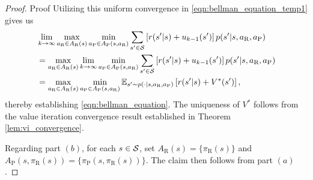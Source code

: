 \documentclass[aoas]{imsart}
\theoremstyle{plain}
\theoremstyle{definition}
\begin{document}
\begin{proof}{Proof}
           Utilizing this uniform convergence in \eqref{eqn:bellman_equation_temp1} gives us 
           \begin{align*}
           &\lim_{k \to \infty}\max_{a_\text{R} \in A_\text{R}(s)}\min_{a_\text{P} \in A_\text{P}(s,a_\text{R})}\sum_{s' \in {\cal S}}\left[r(s'|s) + u_{k-1}(s')\right]p(s'|s,a_\text{R},a_\text{P})\\
           &= \max_{a_\text{R} \in A_\text{R}(s)}\lim_{k \to \infty}\min_{a_\text{P} \in A_\text{P}(s,a_\text{R})}\sum_{s' \in {\cal S}}\left[r(s'|s) + u_{k-1}(s')\right]p(s'|s,a_\text{R},a_\text{P})\\
           &= \max_{a_\text{R} \in A_\text{R}(s)}\min_{a_\text{P} \in A_\text{P}(s,a_\text{R})}\mathbb{E}_{s' \sim p(\cdot|s,a_\text{R},a_\text{P})}\left[r(s'|s) + V^*(s')\right],
           \end{align*}
           thereby establishing \eqref{eqn:bellman_equation}. The uniqueness of $V^*$ follows from the value iteration convergence result established in Theorem \ref{lem:vi_convergence}.
    
           Regarding part $(b)$, for each $s \in {\cal S}$, set $A_\text{R}(s) = \{\pi_\text{R}(s)\}$ and $A_\text{P}(s,\pi_\text{R}(s)) = \{\pi_\text{P}(s,\pi_\text{R}(s))\}$. The claim then  follows from part $(a)$.
       \end{proof}
    
\end{document}
